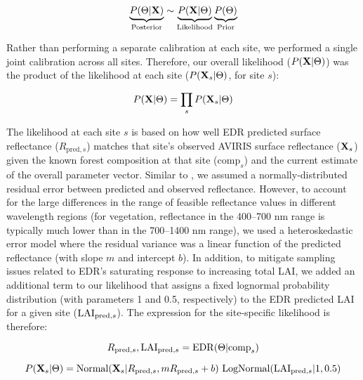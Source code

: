 \begin{equation}
  \underbrace{P(\relax{\Theta} | \mathbf{X})}_{\text{Posterior}} \sim \underbrace{P(\mathbf{X} | \relax{\Theta})}_{\text{Likelihood}} \underbrace{P(\relax{\Theta})}_{\text{Prior}}
\end{equation}

Rather than performing a separate calibration at each site, we performed a single joint calibration across all sites.
Therefore, our overall likelihood ($P(\mathbf{X} | \relax{\Theta})$) was the product of the likelihood at each site ($P(\mathbf{X}_{s} | \relax{\Theta})$, for site $s$):

\begin{equation}
  P(\mathbf{X} | \relax{\Theta}) = \prod_{s} P(\mathbf{X}_{s} | \relax{\Theta})
\end{equation}

The likelihood at each site $s$ is based on how well EDR predicted surface reflectance ($R_{\mathrm{pred}, s}$) matches that site's observed AVIRIS surface reflectance ($\mathbf{X}_{s}$)
given the known forest composition at that site ($\mathrm{comp}_{s}$) and the current estimate of the overall parameter vector.
Similar to \citet{shiklomanov2016quantifying}, we assumed a normally-distributed residual error between predicted and observed reflectance.
However, to account for the large differences in the range of feasible reflectance values in different wavelength regions
(for vegetation, reflectance in the 400--700 \unit{nm} range is typically much lower than in the 700--1400 \unit{nm} range),
we used a heteroskedastic error model where the residual variance was a linear function of the predicted reflectance (with slope $m$ and intercept $b$).
In addition, to mitigate sampling issues related to EDR's saturating response to increasing total LAI, we added an additional term to our likelihood that assigns a fixed lognormal probability distribution (with parameters 1 and 0.5, respectively) to the EDR predicted LAI for a given site ($\mathrm{LAI}_{\mathrm{pred}, s}$).
The expression for the site-specific likelihood is therefore:

\begin{equation}
  R_{\mathrm{pred}, s}, \mathrm{LAI}_{\mathrm{pred}, s} = \mathrm{EDR}(\relax{\Theta} | \mathrm{comp}_{s})
\end{equation}

\begin{equation}
  P(\mathbf{X}_{s} | \relax{\Theta}) =
  \mathrm{Normal}(\mathbf{X}_{s} | R_{\mathrm{pred}, s}, m R_{\mathrm{pred}, s} + b) ~
  \mathrm{LogNormal}(\mathrm{LAI}_{\mathrm{pred}, s} | 1, 0.5)
\end{equation}

